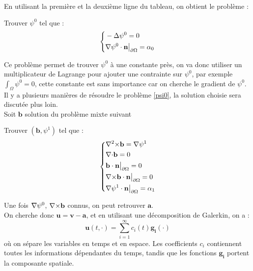En utilisant la première et la deuxième ligne du tableau, on obtient le problème :
\begin{pb}\label{psi0}
Trouver $\psi^0$ tel que :
\begin{equation*}
\left\{\begin{aligned}
&-{\Delta}\psi^0 = 0\\
&{\nabla}\psi^0\cdot \mathbf{n}{\big\rvert_{\partial\Omega}}=\alpha_0
\end{aligned}\right.
\end{equation*}\end{pb}
Ce problème permet de trouver $\psi^0$ à une constante près, on va donc utiliser un multiplicateur de Lagrange pour ajouter une contrainte sur $\psi^0$, par exemple $\int_\Omega \psi^0 = 0$, cette constante est sans importance car on cherche le gradient de $\psi^0$.\\
Il y a plusieurs manières de résoudre le problème \ref{psi0}, la solution choisie sera discutée plus loin.\\

Soit $\mathbf{b}$ solution du problème mixte suivant
\begin{pb}\label{curlb}
Trouver $(\mathbf{b},\psi^1)$ tel que :
\begin{equation*}
\left\{\begin{aligned}
&{\nabla^2\times} \mathbf{b} = {\nabla}\psi^1\\
&{\nabla\cdot} \mathbf{b} = 0\\
&\mathbf{b}\cdot \mathbf{n}{\big\rvert_{\partial\Omega}} = 0\\
&{\nabla\times} \mathbf{b}\cdot \mathbf{n}{\big\rvert_{\partial\Omega}} = 0\\
&{\nabla}\psi^1\cdot \mathbf{n}{\big\rvert_{\partial\Omega}} = \alpha_1
\end{aligned}\right.
\end{equation*}\end{pb}


Une fois ${\nabla}\psi^0$, ${\nabla\times} \mathbf{b}$ connus, on peut retrouver $\mathbf{a}$.\\

On cherche donc $\mathbf{u}=\mathbf{v}-\mathbf{a}$, et en utilisant une décomposition de Galerkin, on a :
\begin{equation}\label{u}
\mathbf{u}(t,\cdot) = \sum_{i=1}^{\infty} c_i(t)\mathbf{g_i}(\cdot)
\end{equation}
où on sépare les variables en temps et en espace. Les coefficients $c_i$ contiennent toutes les informations dépendantes du temps, tandis que les fonctions $\mathbf{g_i}$ portent la composante spatiale.\\

